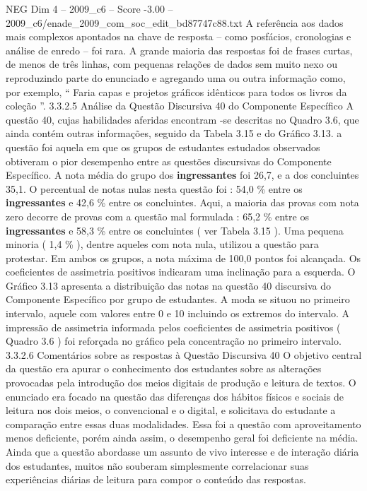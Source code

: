 \begin{textsample}{NEG Dim 4 – 2009\_c6 – Score -3.00 – 2009\_c6/enade\_2009\_com\_soc\_edit\_bd87747c88.txt}
A referência aos dados mais complexos apontados na chave de resposta – como posfácios, cronologias e análise de enredo – foi rara.
A grande maioria das respostas foi de frases curtas, de menos de três linhas, com pequenas relações de dados sem muito nexo ou reproduzindo parte do enunciado e agregando uma ou outra informação como, por exemplo, “ Faria capas e projetos gráficos idênticos para todos os livros da coleção ”. 3.3.2.5 Análise da Questão Discursiva 40 do Componente Específico A questão 40, cujas habilidades aferidas encontram -se descritas no Quadro 3.6, que ainda contém outras informações, seguido da Tabela 3.15 e do Gráfico 3.13. a questão foi aquela em que os grupos de estudantes estudados observados obtiveram o pior desempenho entre as questões discursivas do Componente Específico.
A nota média do grupo dos \textbf{ingressantes} foi 26,7, e a dos concluintes 35,1.
O percentual de notas nulas nesta questão foi : 54,0 \% entre os \textbf{ingressantes} e 42,6 \% entre os concluintes.
Aqui, a maioria das provas com nota zero decorre de provas com a questão mal formulada : 65,2 \% entre os \textbf{ingressantes} e 58,3 \% entre os concluintes ( ver Tabela 3.15 ).
Uma pequena minoria ( 1,4 \% ), dentre aqueles com nota nula, utilizou a questão para protestar.
Em ambos os grupos, a nota máxima de 100,0 pontos foi alcançada.
Os coeficientes de assimetria positivos indicaram uma inclinação para a esquerda.
O Gráfico 3.13 apresenta a distribuição das notas na questão 40 discursiva do Componente Específico por grupo de estudantes.
A moda se situou no primeiro intervalo, aquele com valores entre 0 e 10 incluindo os extremos do intervalo.
A impressão de assimetria informada pelos coeficientes de assimetria positivos ( Quadro 3.6 ) foi reforçada no gráfico pela concentração no primeiro intervalo. 3.3.2.6 Comentários sobre as respostas à Questão Discursiva 40 O objetivo central da questão era apurar o conhecimento dos estudantes sobre as alterações provocadas pela introdução dos meios digitais de produção e leitura de textos.
O enunciado era focado na questão das diferenças dos hábitos físicos e sociais de leitura nos dois meios, o convencional e o digital, e solicitava do estudante a comparação entre essas duas modalidades.
Essa foi a questão com aproveitamento menos deficiente, porém ainda assim, o desempenho geral foi deficiente na média.
Ainda que a questão abordasse um assunto de vivo interesse e de interação diária dos estudantes, muitos não souberam simplesmente correlacionar suas experiências diárias de leitura para compor o conteúdo das respostas.

\end{textsample}

